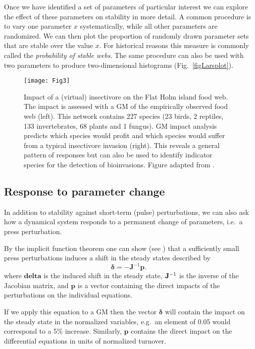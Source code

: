 \documentclass{article}
\newcommand{\eq}[1]{\begin{equation}#1\end{equation}}
\newcommand{\mat}[1]{\mathbf{#1}}
\renewcommand{\vec}[1]{\boldsymbol{#1}}
\begin{document}
Once we have identified a set of parameters of particular interest we can explore the effect of these parameters on stability in more detail. A common procedure is to vary one parameter $x$ systematically, while all other parameters are randomized. We can then plot the proportion of randomly drawn parameter sets that are stable over the value $x$. For historical reasons this measure is commonly called the \emph{probability of stable webs}. The same procedure can also be used with two parameters to produce two-dimensional histograms (Fig.~\ref{figLarsplot}). 

\begin{figure}[ht]
    \centering
    \texttt{[image: Fig3]}
    \caption{Impact of a (virtual) insectivore on the Flat Holm island food web. The impact is assessed with a GM of the empirically observed food web (left). This network contains 227 species (23 birds, 2 reptiles, 133 invertebrates, 68 plants and 1 fungus). GM impact analysis predicts which species would profit and which species would suffer from a typical insectivore invasion (right). This reveals a general pattern of responses but can also be used to identify indicator species for the detection of bioinvasions. Figure adapted from \cite{doizy2018impact}. 
    }
    \label{figcyberinvasive}
\end{figure}

\subsection{Response to parameter change \label{secImpact}}
In addition to stability against short-term (pulse) perturbations, we can also ask how a dynamical system responds to a permanent change of parameters, i.e.~a press perturbation. 

By the implicit function theorem one can show (see \citet{Aufderheide2013PNAS}) that a sufficiently small press perturbations induces a shift in the steady states described by   
\eq{
 \label{eqPerturb}
\vec{\delta} 
= -{\mat{J}^{-1}}\vec{p}.
}
where $\vec{delta}$ is the induced shift in the steady state,
${\bf J}^{-1}$ is the inverse of the Jacobian matrix, and $\vec{p}$
is a vector containing the direct impacts of the perturbations on the individual equations. 

If we apply this equation to a GM then the vector $\vec{\delta}$ will contain the impact on the steady state in the normalized variables, e.g.~an element of 0.05 would correspond to a 5\% increase. Similarly, $\vec{p}$ contains the direct impact on the differential equations in units of normalized turnover.   
\end{document}
